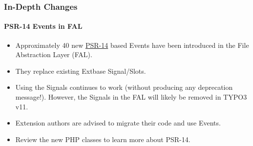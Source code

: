 
\begin{frame}[fragile]
	\frametitle{In-Depth Changes}
	\framesubtitle{PSR-14 Events in FAL}

	\lstset{basicstyle=\tiny\ttfamily}

	\begin{itemize}
		\item Approximately 40 new
			\href{https://www.php-fig.org/psr/psr-14/}{PSR-14}
			based Events have been introduced in the File Abstraction Layer (FAL).
		\item They replace existing Extbase Signal/Slots.
		\item Using the Signals continues to work (without producing any deprecation message!).
			However, the Signals in the FAL will likely be removed in TYPO3 v11.
		\item Extension authors are advised to migrate their code and use Events.
		\item Review the new PHP classes to learn more about PSR-14.
	\end{itemize}

\end{frame}



